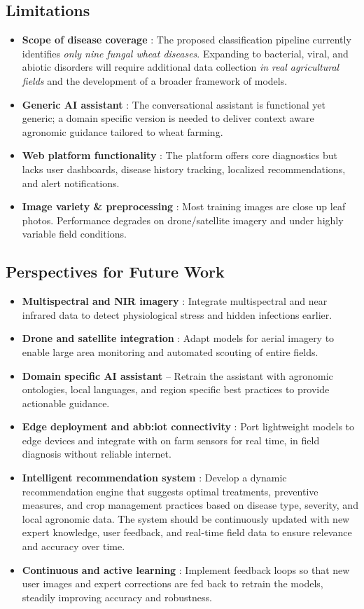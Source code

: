 \subsection*{Limitations}
\begin{itemize}
  \item \textbf{Scope of disease coverage} : The proposed classification pipeline currently identifies \emph{only nine fungal wheat diseases}. Expanding to bacterial, viral, and abiotic disorders will require additional data collection \emph{in real agricultural fields} and the development of a broader framework of models.
  \item \textbf{Generic AI assistant} : The conversational assistant is functional yet generic; a domain specific version is needed to deliver context aware agronomic guidance tailored to wheat farming.
  \item \textbf{Web platform functionality} : The platform offers core diagnostics but lacks user dashboards, disease history tracking, localized recommendations, and alert notifications.
  \item \textbf{Image variety \& preprocessing} : Most training images are close up leaf photos. Performance degrades on drone/satellite imagery and under highly variable field conditions.
\end{itemize}

\subsection*{Perspectives for Future Work}
\begin{itemize}
  \item \textbf{Multispectral and NIR imagery} : Integrate multispectral and near infrared data to detect physiological stress and hidden infections earlier.
  \item \textbf{Drone and satellite integration} : Adapt models for aerial imagery to enable large area monitoring and automated scouting of entire fields.
  \item \textbf{Domain specific AI assistant} – Retrain the assistant with agronomic ontologies, local languages, and region specific best practices to provide actionable guidance.
  \item \textbf{Edge deployment and \gls{abb:iot} connectivity} : Port lightweight models to edge devices and integrate with on farm sensors for real time, in field diagnosis without reliable internet.
  \item \textbf{Intelligent recommendation system} : Develop a dynamic recommendation engine that suggests optimal treatments, preventive measures, and crop management practices based on disease type, severity, and local agronomic data. The system should be continuously updated with new expert knowledge, user feedback, and real-time field data to ensure relevance and accuracy over time.
  \item \textbf{Continuous and active learning} : Implement feedback loops so that new user images and expert corrections are fed back to retrain the models, steadily improving accuracy and robustness.
\end{itemize}